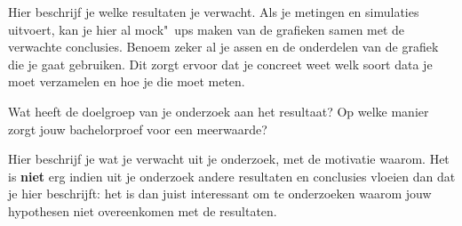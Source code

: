 Hier beschrijf je welke resultaten je verwacht. Als je metingen en simulaties uitvoert, kan je hier al mock"~ups maken van de grafieken samen met de verwachte conclusies. Benoem zeker al je assen en de onderdelen van de grafiek die je gaat gebruiken. Dit zorgt ervoor dat je concreet weet welk soort data je moet verzamelen en hoe je die moet meten.

Wat heeft de doelgroep van je onderzoek aan het resultaat? Op welke manier zorgt jouw bachelorproef voor een meerwaarde?

Hier beschrijf je wat je verwacht uit je onderzoek, met de motivatie waarom. Het is \textbf{niet} erg indien uit je onderzoek andere resultaten en conclusies vloeien dan dat je hier beschrijft: het is dan juist interessant om te onderzoeken waarom jouw hypothesen niet overeenkomen met de resultaten.

